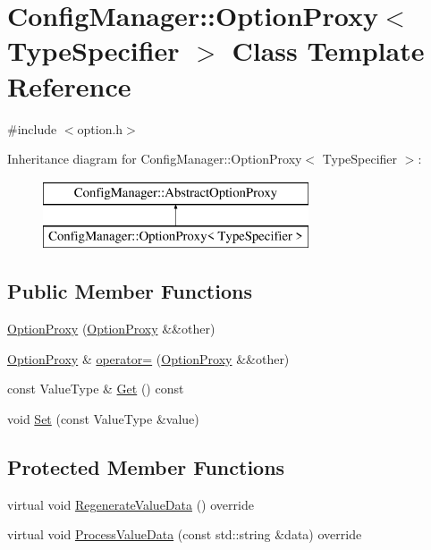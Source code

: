 \hypertarget{class_config_manager_1_1_option_proxy}{}\section{Config\+Manager\+:\+:Option\+Proxy$<$ Type\+Specifier $>$ Class Template Reference}
\label{class_config_manager_1_1_option_proxy}


{\ttfamily \#include $<$option.\+h$>$}

Inheritance diagram for Config\+Manager\+:\+:Option\+Proxy$<$ Type\+Specifier $>$\+:\begin{figure}[H]
\begin{center}
\leavevmode
\includegraphics[height=2.000000cm]{class_config_manager_1_1_option_proxy}
\end{center}
\end{figure}
\subsection*{Public Member Functions}
\begin{DoxyCompactItemize}
\item 
\hyperlink{class_config_manager_1_1_option_proxy_ac72f87c50e3a887efb370d3d1249de8c}{Option\+Proxy} (\hyperlink{class_config_manager_1_1_option_proxy}{Option\+Proxy} \&\&other)
\item 
\hyperlink{class_config_manager_1_1_option_proxy}{Option\+Proxy} \& \hyperlink{class_config_manager_1_1_option_proxy_af571eb1d01be954f718adf22a6affcd1}{operator=} (\hyperlink{class_config_manager_1_1_option_proxy}{Option\+Proxy} \&\&other)
\item 
const Value\+Type \& \hyperlink{class_config_manager_1_1_option_proxy_a6c305bd6065c63e8b263660bf46ec727}{Get} () const 
\item 
void \hyperlink{class_config_manager_1_1_option_proxy_aa2be6bc353562df57f88ab222d38a2a3}{Set} (const Value\+Type \&value)
\end{DoxyCompactItemize}
\subsection*{Protected Member Functions}
\begin{DoxyCompactItemize}
\item 
virtual void \hyperlink{class_config_manager_1_1_option_proxy_a6f0f8c517701e7f55c2572e2deae6ad9}{Regenerate\+Value\+Data} () override
\item 
virtual void \hyperlink{class_config_manager_1_1_option_proxy_a41e884af79ba112250af76538cc38dc1}{Process\+Value\+Data} (const std\+::string \&data) override
\end{DoxyCompactItemize}
